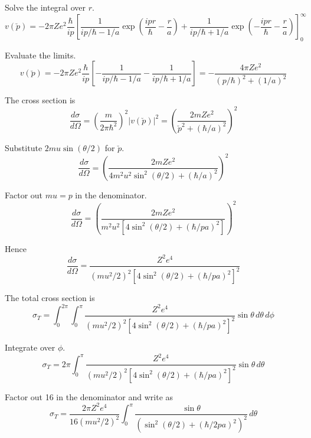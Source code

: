 Solve the integral over $r$.
\begin{equation*}
v(\breve p)=-2\pi Ze^2
\frac{\hbar}{ip}
\left[
\frac{1}{ip/\hbar-1/a}
\exp\left(\frac{ipr}{\hbar}-\frac{r}{a}\right)
+\frac{1}{ip/\hbar+1/a}
\exp\left(-\frac{ipr}{\hbar}-\frac{r}{a}\right)
\right]_0^\infty
\end{equation*}

Evaluate the limits.
\begin{equation*}
v(\breve p)=-2\pi Ze^2
\frac{\hbar}{ip}
\left[
-\frac{1}{ip/\hbar-1/a}
-\frac{1}{ip/\hbar+1/a}
\right]
=-\frac{4\pi Ze^2}{(p/\hbar)^2+(1/a)^2}
\end{equation*}

The cross section is
\begin{equation*}
\frac{d\sigma}{d\Omega}
=\left(\frac{m}{2\pi\hbar^2}\right)^2|v(\breve p)|^2
=\left(\frac{2mZe^2}{\breve p^2+(\hbar/a)^2}\right)^2
\end{equation*}

Substitute $2mu\sin(\theta/2)$ for $\breve p$.
\begin{equation*}
\frac{d\sigma}{d\Omega}
=\left(\frac{2mZe^2}{4m^2u^2\sin^2(\theta/2)+(\hbar/a)^2}\right)^2
\end{equation*}

Factor out $mu=p$ in the denominator.
\begin{equation*}
\frac{d\sigma}{d\Omega}
=\left(\frac{2mZe^2}{m^2u^2\left[4\sin^2(\theta/2)+(\hbar/pa)^2\right]}\right)^2
\end{equation*}

Hence
\begin{equation*}
\frac{d\sigma}{d\Omega}=\frac{Z^2e^4}
{(mu^2/2)^2\left[4\sin^2(\theta/2)+(\hbar/pa)^2\right]^2}
\end{equation*}

The total cross section is
\begin{equation*}
\sigma_T=\int_0^{2\pi}\int_0^\pi
\frac{Z^2e^4}
{(mu^2/2)^2\left[4\sin^2(\theta/2)+(\hbar/pa)^2\right]^2}\sin\theta\,d\theta\,d\phi
\end{equation*}

Integrate over $\phi$.
\begin{equation*}
\sigma_T=2\pi\int_0^\pi
\frac{Z^2e^4}
{(mu^2/2)^2\left[4\sin^2(\theta/2)+(\hbar/pa)^2\right]^2}\sin\theta\,d\theta
\end{equation*}

Factor out 16 in the denominator and write as
\begin{equation*}
\sigma_T=\frac{2\pi Z^2e^4}{16(mu^2/2)^2}\int_0^\pi
\frac{\sin\theta}{\left(\sin^2(\theta/2)+(\hbar/2pa)^2\right)^2}\,d\theta
\end{equation*}

